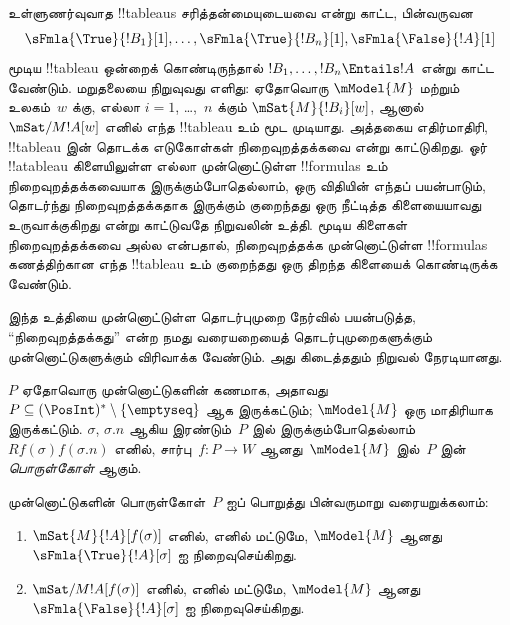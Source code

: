 \documentclass[../../../include/open-logic-section]{subfiles}
\begin{document}


\begin{explain}
  உள்ளுணர்வுவாத !!{tableau}s சரித்தன்மையுடையவை என்று காட்ட, பின்வருவன
  \[
  \sFmla{\True}{!B_1}[1], \dots, \sFmla{\True}{!B_n}[1], \sFmla{\False}{!A}[1]
  \]
  மூடிய !!{tableau} ஒன்றைக் கொண்டிருந்தால்
  $!B_1, \dots, !B_n \Entails !A$ என்று காட்ட வேண்டும். மறுதலையை
  நிறுவுவது எளிது: ஏதோவொரு $\mModel{M}$ மற்றும் உலகம்~$w$ க்கு,
  எல்லா $i=1$, \dots,~$n$ க்கும் $\mSat{M}{!B_i}[w]$, ஆனால்
  $\mSat/{M}{!A}[w]$ எனில் எந்த !!{tableau} உம் மூட முடியாது.
  அத்தகைய எதிர்மாதிரி, !!{tableau} இன் தொடக்க எடுகோள்கள்
  நிறைவுறத்தக்கவை என்று காட்டுகிறது. ஓர் !!a{tableau} கிளையிலுள்ள எல்லா
  முன்னொட்டுள்ள !!{formula}s உம் நிறைவுறத்தக்கவையாக இருக்கும்போதெல்லாம்,
  ஒரு விதியின் எந்தப் பயன்பாடும், தொடர்ந்து நிறைவுறத்தக்கதாக இருக்கும்
  குறைந்தது ஒரு நீட்டித்த கிளையையாவது உருவாக்குகிறது என்று காட்டுவதே
  நிறுவலின் உத்தி. மூடிய கிளைகள் நிறைவுறத்தக்கவை அல்ல என்பதால்,
  நிறைவுறத்தக்க முன்னொட்டுள்ள !!{formula}s கணத்திற்கான எந்த !!{tableau} உம்
  குறைந்தது ஒரு திறந்த கிளையைக் கொண்டிருக்க வேண்டும்.

  இந்த உத்தியை முன்னொட்டுள்ள தொடர்புமுறை நேர்வில் பயன்படுத்த,
  ``நிறைவுறத்தக்கது'' என்ற நமது வரையறையைத் தொடர்புமுறைகளுக்கும்
  முன்னொட்டுகளுக்கும் விரிவாக்க வேண்டும். அது கிடைத்ததும் நிறுவல் நேரடியானது.
\end{explain}

\begin{defn}
  $P$ ஏதோவொரு முன்னொட்டுகளின் கணமாக, அதாவது
  $P \subseteq (\PosInt)^* \setminus \{\emptyseq\}$ ஆக இருக்கட்டும்;
  $\mModel{M}$ ஒரு மாதிரியாக இருக்கட்டும். $\sigma$, $\sigma.n$ ஆகிய
  இரண்டும்~$P$ இல் இருக்கும்போதெல்லாம் $Rf(\sigma)f(\sigma.n)$ எனில்,
  சார்பு~$f\colon P \to W$ ஆனது~$\mModel{M}$ இல்~$P$ இன்
  \emph{பொருள்கோள்} ஆகும்.

  முன்னொட்டுகளின் பொருள்கோள்~$P$ ஐப் பொறுத்து பின்வருமாறு வரையறுக்கலாம்:
  \begin{enumerate}
  \item $\mSat{M}{!A}[f(\sigma)]$ எனில், எனில் மட்டுமே,
    $\mModel{M}$ ஆனது $\sFmla{\True}{!A}[\sigma]$ ஐ நிறைவுசெய்கிறது.
  \item $\mSat/{M}{!A}[f(\sigma)]$ எனில், எனில் மட்டுமே,
    $\mModel{M}$ ஆனது $\sFmla{\False}{!A}[\sigma]$ ஐ நிறைவுசெய்கிறது.
  \end{enumerate}
\end{defn}
\end{document}
